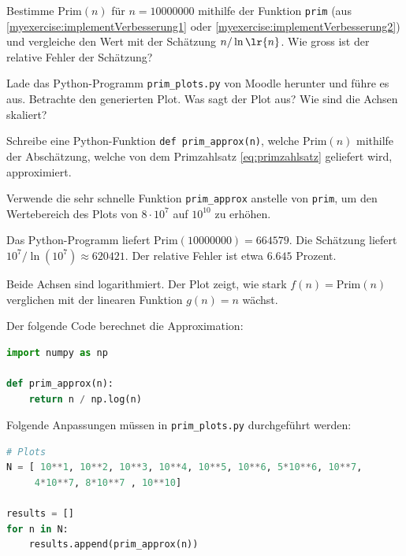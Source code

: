 \begin{myexercise}
	\begin{aenum}
		\item Bestimme $\text{Prim}(n)$ für $n = \num{10000000}$ mithilfe der Funktion \lstinline|prim| (aus \cref{myexercise:implementVerbesserung1} oder \cref{myexercise:implementVerbesserung2}) und vergleiche den Wert mit der Schätzung $n/\ln\lr{n}$.
		Wie gross ist der relative Fehler der Schätzung?

		\item Lade das Python-Programm {\tt prim\_plots.py} von Moodle herunter und führe es aus. Betrachte den generierten Plot. Was sagt der Plot aus? Wie sind die Achsen skaliert?

		\item Schreibe eine Python-Funktion \lstinline|def prim_approx(n)|, welche $\text{Prim}(n)$ mithilfe der Abschätzung, welche von dem Primzahlsatz \ref{eq:primzahlsatz} geliefert wird, approximiert.

		\item Verwende die sehr schnelle Funktion \lstinline|prim_approx| anstelle von \lstinline|prim|, um den Wertebereich des Plots von $8\cdot 10^7$ auf $10^{10}$ zu erhöhen.
	\end{aenum}
	\begin{myanswer}
		\begin{aenum}
			\item Das Python-Programm liefert $\text{Prim}(10000000) = \num{664579}$. Die Schätzung liefert $10^7/\ln{(10^7)}\approx \num{620421}$. Der relative Fehler ist etwa $6.645$ Prozent.

			\item Beide Achsen sind logarithmiert. Der Plot zeigt, wie stark $f(n) = \text{Prim}(n)$ verglichen mit der linearen Funktion $g(n) = n$ wächst.

			\item Der folgende Code berechnet die Approximation:

			\begin{lstlisting}[language=Python,numbers=none]
import numpy as np

def prim_approx(n):
    return n / np.log(n)
\end{lstlisting}
			\item
			Folgende Anpassungen müssen in {\tt prim\_plots.py} durchgeführt werden:
			\begin{lstlisting}[language=Python,numbers=none]
# Plots
N = [ 10**1, 10**2, 10**3, 10**4, 10**5, 10**6, 5*10**6, 10**7,
     4*10**7, 8*10**7 , 10**10]

results = []
for n in N:
    results.append(prim_approx(n))
\end{lstlisting}
		\end{aenum}
	\end{myanswer}
\end{myexercise}


